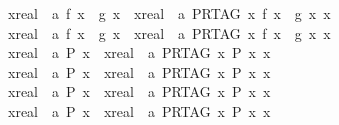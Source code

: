 \begin{isabellebody}
\ \ {\isachardoublequoteopen}{\isacharparenleft}{\isasymforall}x{\isacharcolon}{\isacharcolon}real\ {\isachargreater}\ a{\isachardot}\ f\ x\ {\isacharless}\ g\ x{\isacharparenright}\ {\isacharequal}\ {\isacharparenleft}{\isasymforall}x{\isacharcolon}{\isacharcolon}real\ {\isachargreater}\ a{\isachardot}\ PR{\isacharunderscore}TAG\ {\isacharparenleft}{\isasymlambda}x{\isachardot}\ f\ x\ {\isacharless}\ g\ x{\isacharparenright}\ x{\isacharparenright}{\isachardoublequoteclose}\isanewline
\ \ {\isachardoublequoteopen}{\isacharparenleft}{\isasymforall}x{\isacharcolon}{\isacharcolon}real\ {\isasymge}\ a{\isachardot}\ f\ x\ {\isacharless}\ g\ x{\isacharparenright}\ {\isacharequal}\ {\isacharparenleft}{\isasymforall}x{\isacharcolon}{\isacharcolon}real\ {\isasymge}\ a{\isachardot}\ PR{\isacharunderscore}TAG\ {\isacharparenleft}{\isasymlambda}x{\isachardot}\ f\ x\ {\isacharless}\ g\ x{\isacharparenright}\ x{\isacharparenright}{\isachardoublequoteclose}\isanewline
\ \ {\isachardoublequoteopen}{\isacharparenleft}{\isasymforall}x{\isacharcolon}{\isacharcolon}real\ {\isacharless}\ a{\isachardot}\ P\ x{\isacharparenright}\ {\isacharequal}\ {\isacharparenleft}{\isasymforall}x{\isacharcolon}{\isacharcolon}real\ {\isacharless}\ a{\isachardot}\ {\isasymnot}{\isacharparenleft}PR{\isacharunderscore}TAG\ {\isacharparenleft}{\isasymlambda}x{\isachardot}\ {\isasymnot}P\ x{\isacharparenright}{\isacharparenright}\ x{\isacharparenright}{\isachardoublequoteclose}\isanewline
\ \ {\isachardoublequoteopen}{\isacharparenleft}{\isasymforall}x{\isacharcolon}{\isacharcolon}real\ {\isachargreater}\ a{\isachardot}\ P\ x{\isacharparenright}\ {\isacharequal}\ {\isacharparenleft}{\isasymforall}x{\isacharcolon}{\isacharcolon}real\ {\isachargreater}\ a{\isachardot}\ {\isasymnot}{\isacharparenleft}PR{\isacharunderscore}TAG\ {\isacharparenleft}{\isasymlambda}x{\isachardot}\ {\isasymnot}P\ x{\isacharparenright}{\isacharparenright}\ x{\isacharparenright}{\isachardoublequoteclose}\isanewline
\ \ {\isachardoublequoteopen}{\isacharparenleft}{\isasymforall}x{\isacharcolon}{\isacharcolon}real\ {\isasymle}\ a{\isachardot}\ P\ x{\isacharparenright}\ {\isacharequal}\ {\isacharparenleft}{\isasymforall}x{\isacharcolon}{\isacharcolon}real\ {\isasymle}\ a{\isachardot}\ {\isasymnot}{\isacharparenleft}PR{\isacharunderscore}TAG\ {\isacharparenleft}{\isasymlambda}x{\isachardot}\ {\isasymnot}P\ x{\isacharparenright}{\isacharparenright}\ x{\isacharparenright}{\isachardoublequoteclose}\isanewline
\ \ {\isachardoublequoteopen}{\isacharparenleft}{\isasymforall}x{\isacharcolon}{\isacharcolon}real\ {\isasymge}\ a{\isachardot}\ P\ x{\isacharparenright}\ {\isacharequal}\ {\isacharparenleft}{\isasymforall}x{\isacharcolon}{\isacharcolon}real\ {\isasymge}\ a{\isachardot}\ {\isasymnot}{\isacharparenleft}PR{\isacharunderscore}TAG\ {\isacharparenleft}{\isasymlambda}x{\isachardot}\ {\isasymnot}P\ x{\isacharparenright}{\isacharparenright}\ x{\isacharparenright}{\isachardoublequoteclose}\isanewline

\end{isabellebody}
